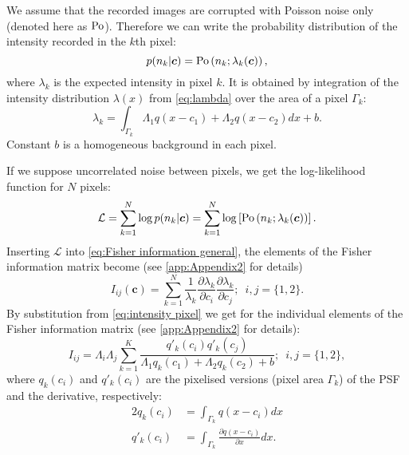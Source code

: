 We assume that the recorded images are corrupted with Poisson noise only (denoted here as $\mathrm{Po}$). Therefore we can write the probability distribution of the intensity recorded in the $k$th pixel:
%
\begin{equation*}
	p(n_k|\bm{c})=\mathrm{Po}\left(n_k;\lambda_k(\bm{c})\right),
\end{equation*}
%
where $\lambda_k$ is the expected intensity in pixel $k$. It is obtained by integration of the intensity distribution $\lambda(x)$ from \autoref{eq:lambda} over the area of a pixel $\Gamma_k$:
%
\begin{equation}
	\lambda_k=\int_{\Gamma_k}\Lambda_1q(x-c_1)+\Lambda_2q(x-c_2)dx+b.	
	\label{eq:intensity pixel}
\end{equation}
%
Constant $b$ is a homogeneous background in each pixel.

If we suppose uncorrelated noise between pixels, we get the log-likelihood function for $N$ pixels: 
%
\begin{equation}
	\mathcal{L}=\sum_{k=1}^N\log p(n_k|\bm{c})=\sum_{k=1}^N\log\left[\mathrm{Po}\left(n_k;\lambda_k(\bm{c})\right)\right].
	\label{eq:FREM likekihood Poisson}
\end{equation}
%
Inserting $\mathcal{L}$ into \autoref{eq:Fisher information general}, the elements of the Fisher information matrix become (see \autoref{app:Appendix2} for details)
%
\begin{equation}
	I_{ij}(\bm{c})=\sum_{k=1}^N\frac{1}{\lambda_k}\frac{\partial\lambda_k}{\partial c_i}\frac{\partial\lambda_k}{\partial c_j};\; \ i,j=\{1,2\}.
	\label{eq:FI - entries}
\end{equation}
%
By substitution from \autoref{eq:intensity pixel} we get for the individual elements of the Fisher information matrix (see \autoref{app:Appendix2} for details): 
%
\begin{equation}
	I_{ij} =\Lambda_i\Lambda_j\sum_{k=1}^{K}\frac{q'_k(c_i)q'_k(c_j)}{\Lambda_1q_k(c_1)+\Lambda_2q_k(c_2)+b};\; \ i,j=\{1,2\},
	\label{eq:FI - individual}
\end{equation}
%
where $q_k(c_i)$ and $q'_k(c_i)$ are the pixelised versions (pixel area $\Gamma_k$) of the PSF and the derivative, respectively:
%
\begin{alignat*}{2}
	q_k(c_i) & =\int_{\Gamma_k}q(x-c_i)dx\\
	q'_k(c_i) & =\int_{\Gamma_k}\frac{\partial q(x-c_i)}{\partial x}dx.
\end{alignat*}
%

